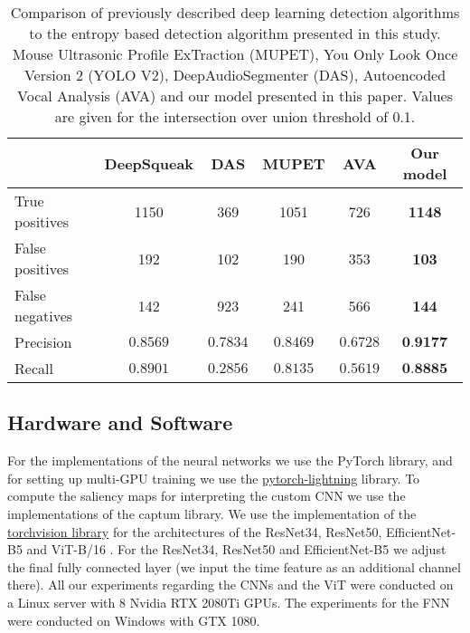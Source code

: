 \documentclass[preprint,NumberedRefs]{JASA}
\begin{document}
\begin{table}[ht]

    \caption{Comparison of previously described deep learning detection algorithms to the entropy based detection algorithm presented in this study. Mouse Ultrasonic Profile ExTraction (MUPET), You Only Look Once Version 2 (YOLO V2), DeepAudioSegmenter (DAS), Autoencoded Vocal Analysis (AVA) and our model presented in this paper. Values are given for the intersection over union threshold of 0.1.}\label{tab:benchmarking}
    \begin{ruledtabular}
    \begin{tabular}{lccccc}
      & DeepSqueak & DAS & MUPET & AVA & Our model \\
      \hline
      True positives & 1150 & 369 & 1051 & 726 & \textbf{1148} \\
      False positives & 192 & 102 & 190 & 353 & \textbf{103} \\
      False negatives & 142 & 923 & 241 & 566 & \textbf{144} \\
      Precision & \( 0.8569 \) & \( 0.7834 \) & \(0.8469\) & \(0.6728 \) & \( \textbf{0.9177} \) \\
      Recall & \( 0.8901 \) & \( 0.2856 \) & \( 0.8135 \) & \(0.5619 \) & \( \textbf{0.8885} \) \\
  
    \end{tabular}
    \end{ruledtabular}
  \end{table}

\FloatBarrier

\subsection{Hardware and Software}
\label{sec:Hardware_software}

For the implementations of the neural networks we use the PyTorch library, and for setting up multi-GPU training we use the \href{https://github.com/Lightning-AI/lightning}{pytorch-lightning} library. \cite{paszke2019} To compute the saliency maps for interpreting the custom CNN we use the implementations of the captum library. \cite{kokhlikyan2020captum}
%
We use the implementation of the \href{https://github.com/pytorch/vision}{torchvision library} for the architectures of the ResNet34, ResNet50, EfficientNet-B5 \cite{efficientnetv1} and ViT-B/16 \cite{ViT}.
%
For the ResNet34, ResNet50 and EfficientNet-B5 we adjust the final fully connected layer (we input the time feature as an additional channel there).
%
All our experiments regarding the CNNs and the ViT were conducted on a Linux server with 8 Nvidia RTX 2080Ti GPUs. The experiments for the FNN were conducted on Windows with GTX 1080.
\end{document}
